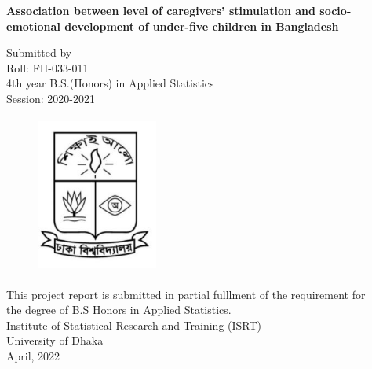 \documentclass[
  12pt,
  oneside]{report}
\author{}
\date{\vspace{-2.5em}}
\begin{document}


\begin{center}
\huge{\textbf{Association between level of caregivers' stimulation and socio-emotional development of under-five children in Bangladesh}}\\

\vspace*{1.5\baselineskip}

\textbf\Large{{Submitted by}}\\
\vspace{2mm}
\Large{Roll: FH-033-011\\
\vspace{2mm}
4th year B.S.(Honors) in Applied Statistics\\
\vspace{2mm}
Session: 2020-2021}\\

\vspace*{1.5\baselineskip}

\begin{figure}
  \centering
  \includegraphics[width=4cm, height=5.2cm]{../logo/logo.JPG}
\end{figure}


\vspace*{1.5\baselineskip}

\large{This project report is submitted in partial fulllment of the requirement for}\\
\large{the degree of B.S Honors in Applied Statistics.} \\
\vspace*{2\baselineskip}
\Large{Institute of Statistical Research and Training (ISRT) \\
University of Dhaka} \\
\Large{April, 2022}\\

\end{center}
\end{document}
